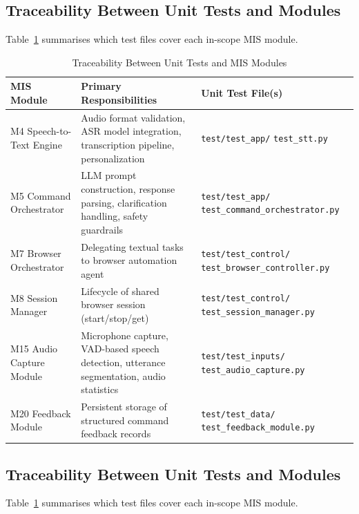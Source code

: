 \documentclass[12pt, titlepage]{article}
\begin{document}
\subsection{Traceability Between Unit Tests and Modules}

Table~\ref{tab:unit-traceability} summarises which test files cover each in-scope MIS module.

\begin{table}[H]
\centering
\caption{Traceability Between Unit Tests and MIS Modules}
\label{tab:unit-traceability}
\renewcommand{\arraystretch}{1.2}
\begin{tabular}{|p{3.5cm}|p{5.5cm}|p{6cm}|}
\hline
\textbf{MIS Module} & \textbf{Primary Responsibilities} & \textbf{Unit Test File(s)} \\
\hline
M4 Speech-to-Text Engine & Audio format validation, ASR model integration, transcription pipeline, personalization & \texttt{test/test\_app/} \texttt{test\_stt.py} \\
\hline
M5 Command Orchestrator & LLM prompt construction, response parsing, clarification handling, safety guardrails & \texttt{test/test\_app/} \texttt{test\_command\_orchestrator.py} \\
\hline
M7 Browser Orchestrator & Delegating textual tasks to browser automation agent & \texttt{test/test\_control/} \texttt{test\_browser\_controller.py} \\
\hline
M8 Session Manager & Lifecycle of shared browser session (start/stop/get) & \texttt{test/test\_control/} \texttt{test\_session\_manager.py} \\
\hline
M15 Audio Capture Module & Microphone capture, VAD-based speech detection, utterance segmentation, audio statistics & \texttt{test/test\_inputs/} \texttt{test\_audio\_capture.py} \\
\hline
M20 Feedback Module & Persistent storage of structured command feedback records & \texttt{test/test\_data/} \texttt{test\_feedback\_module.py} \\
\hline
\end{tabular}
\end{table}

\subsection{Traceability Between Unit Tests and Modules}

Table~\ref{tab:unit-traceability} summarises which test files cover each in-scope MIS module.
\end{document}
